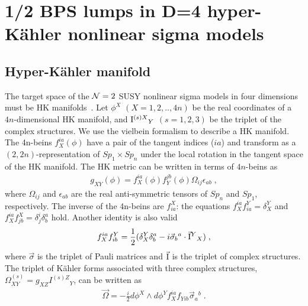 \documentclass[a4paper,12pt]{article}
\newcommand{\kahler}{K\"{a}hler }
\begin{document}
\vspace{5mm}
\section{1/2 BPS lumps in D=4 hyper-\kahler 
nonlinear sigma models}\label{sc:lump}
\subsection{Hyper-\kahler manifold}
The target space of the ${\cal N}=2$ 
SUSY nonlinear sigma models in four dimensions  
must be HK manifolds~\cite{AF1}.  
Let $\phi ^X$ $(X=1,2,..,4n)$ be the real 
coordinates of a $4n$-dimensional HK manifold, 
and ${{\rm I}^{(s)X}}_Y$ $(s=1,2,3)$ be 
the triplet of the complex structures.  
We use the vielbein formalism to describe a HK manifold. 
The 4n-beins $f^{ia}_X(\phi)$ have 
a pair of the tangent indices ($ia$) and 
transform as a $(2,2n)$-representation of $Sp_1 \times Sp_n$ 
under the local rotation in the tangent space 
of the HK manifold. 
The HK metric can be written in terms of $4n$-beins as 
\begin{eqnarray}
  g_{XY}(\phi) = f^{ia}_X(\phi) f^{jb}_Y(\phi) 
  \Omega _{ij}\epsilon _{ab}\;,
\end{eqnarray}
where $\Omega _{ij}$ and $\epsilon _{ab}$ are 
the real anti-symmetric tensors of $Sp_n$ and $Sp_1$, respectively. 
The inverse of the 4n-beins are $f_{ia}^X$: 
the equations $f^{ia}_X f_{ia}^Y = \delta_X^Y$ 
and $f^{ia}_X f_{jb}^X = \delta_j^i \delta_b^a$ hold. 
Another identity is also valid 
\begin{eqnarray}
f^{ia}_X f^Y_{ib} = \frac{1}{2}(\delta ^Y_X\delta ^a_b 
  - i\vec{\sigma} _b{}^a \cdot \vec{\rm I} ^Y{}_X) \;, 
\label{f-identity}
\end{eqnarray}
where $\vec{\sigma}$ is the triplet of Pauli matrices and 
$\vec{\rm I}$ is the triplet of complex structures. 
The triplet of \kahler forms associated 
with three complex structures, 
$\Omega^{(s)}_{XY} = g_{XZ}{I^{(s)Z}}_Y$, can be written as  
\begin{eqnarray}
 \vec{\Omega} = -\frac{i}{2}d\phi^X\wedge d\phi^Y f^{ia}_X f_{Yib}
                \vec{\sigma}_a{}^b \;. 
 \label{kahler-form}
\end{eqnarray}
\end{document}
